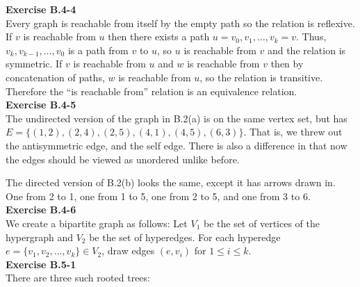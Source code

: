 \documentclass{article}
\begin{document}
 
\noindent\textbf{Exercise B.4-4}\\

Every graph is reachable from itself by the empty path so the relation is reflexive.  If $v$ is reachable from $u$ then there exists a path $u = v_0, v_1, \ldots, v_k = v$.  Thus, $v_k, v_{k-1}, \ldots, v_0$ is a path from $v$ to $u$, so $u$ is reachable from $v$ and the relation is symmetric.  If $v$ is reachable from $u$ and $w$ is reachable from $v$ then by concatenation of paths, $w$ is reachable from $u$, so the relation is transitive.  Therefore the ``is reachable from'' relation is an equivalence relation. \\


\noindent\textbf{Exercise B.4-5}\\
The undirected version of the graph in B.2(a) is on the same vertex set, but has $E =\{(1,2),(2,4),(2,5),(4,1),(4,5),(6,3)\}$. That is, we threw out the antisymmetric edge, and the self edge. There is also a difference in that now the edges should be viewed as unordered unlike before.

The directed version of B.2(b) looks the same, except it has arrows drawn in. One from 2 to 1, one from 1 to 5, one from 2 to 5, and one from 3 to 6.\\

\noindent\textbf{Exercise B.4-6}\\

We create a bipartite graph as follows:  Let $V_1$ be the set of vertices of the hypergraph and $V_2$ be the set of hyperedges.  For each hyperedge $e = \{v_1, v_2, \ldots, v_k\} \in V_2$, draw edges $(e,v_i)$ for $1 \leq i \leq k$.  \\


\noindent\textbf{Exercise B.5-1}\\
There are three such rooted trees:

\end{document}
